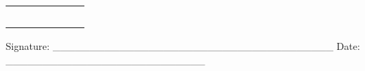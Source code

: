 \documentclass[14pt]{article}
\begin{document}
\begin{table}[H]
\begin{adjustbox}{max width=\textwidth}
\begin{tabular}{p{3.17cm}p{3.92cm}p{1.62cm}p{1.96cm}p{1.96cm}p{1.51cm}p{2.86cm}}
\multicolumn{1}{|p{1.62cm}|}{\par  } & 
\multicolumn{1}{|p{1.96cm}|}{\par  } & 
\multicolumn{1}{|p{1.96cm}|}{\par  } & 
\multicolumn{1}{|p{1.51cm}|}{\par  } & 
\multicolumn{1}{|p{2.86cm}|}{\par  } \\ 
\hhline{-------}
\multicolumn{1}{|p{3.17cm}|}{\par  } & 
\multicolumn{1}{|p{3.92cm}|}{\par  } & 
\multicolumn{1}{|p{1.62cm}|}{\par  } & 
\multicolumn{1}{|p{1.96cm}|}{\par  } & 
\multicolumn{1}{|p{1.96cm}|}{\par  } & 
\multicolumn{1}{|p{1.51cm}|}{\par  } & 
\multicolumn{1}{|p{2.86cm}|}{\par  } \\ 
\hhline{-------}
\multicolumn{1}{|p{3.17cm}|}{\par  } & 
\multicolumn{1}{|p{3.92cm}|}{\par  } & 
\multicolumn{1}{|p{1.62cm}|}{\par  } & 
\multicolumn{1}{|p{1.96cm}|}{\par  } & 
\multicolumn{1}{|p{1.96cm}|}{\par  } & 
\multicolumn{1}{|p{1.51cm}|}{\par  } & 
\multicolumn{1}{|p{2.86cm}|}{\par  } \\ 
\hhline{-------}
\multicolumn{1}{|p{3.17cm}|}{\par  } & 
\multicolumn{1}{|p{3.92cm}|}{\par  } & 
\multicolumn{1}{|p{1.62cm}|}{\par  } & 
\multicolumn{1}{|p{1.96cm}|}{\par  } & 
\multicolumn{1}{|p{1.96cm}|}{\par  } & 
\multicolumn{1}{|p{1.51cm}|}{\par  } & 
\multicolumn{1}{|p{2.86cm}|}{\par  } \\ 
\hhline{-------}
\end{tabular}
\end{adjustbox}
\end{table}
\raggedright \par  
\raggedright \par  
\raggedright \par  
\raggedright \par \normalsize{Signature: \_\_\_\_\_\_\_\_\_\_\_\_\_\_\_\_\_\_\_\_\_\_\_\_\_\_\_\_\_\_\_\_\_\_\_\_\_\_  Date: \_\_\_\_\_\_\_\_\_\_\_\_\_\_\_\_\_\_\_\_\_\_\_\_\_\_\_}
\end{document}

